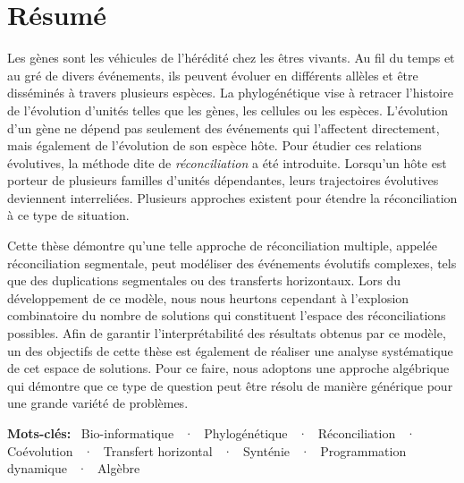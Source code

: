 \chapter*{Résumé}

Les gènes sont les véhicules de l’hérédité chez les êtres vivants.
Au fil du temps et au gré de divers événements, ils peuvent évoluer en différents allèles et être disséminés à travers plusieurs espèces.
La phylogénétique vise à retracer l’histoire de l’évolution d’unités telles que les gènes, les cellules ou les espèces.
L’évolution d’un gène ne dépend pas seulement des événements qui l’affectent directement, mais également de l’évolution de son espèce hôte.
Pour étudier ces relations évolutives, la méthode dite de \emph{réconciliation} a été introduite.
Lorsqu’un hôte est porteur de plusieurs familles d’unités dépendantes, leurs trajectoires évolutives deviennent interreliées.
Plusieurs approches existent pour étendre la réconciliation à ce type de situation.

Cette thèse démontre qu’une telle approche de réconciliation multiple, appelée réconciliation segmentale, peut modéliser des événements évolutifs complexes, tels que des duplications segmentales ou des transferts horizontaux.
Lors du développement de ce modèle, nous nous heurtons cependant à l’explosion combinatoire du nombre de solutions qui constituent l’espace des réconciliations possibles.
Afin de garantir l’interprétabilité des résultats obtenus par ce modèle, un des objectifs de cette thèse est également de réaliser une analyse systématique de cet espace de solutions.
Pour ce faire, nous adoptons une approche algébrique qui démontre que ce type de question peut être résolu de manière générique pour une grande variété de problèmes.

\textbf{Mots-clés:}
\  Bio-informatique
~·~ Phylogénétique
~·~ Réconciliation
~·~ Coévolution
~·~ Transfert horizontal
~·~ Synténie
~·~ Programmation dynamique
~·~ Algèbre
